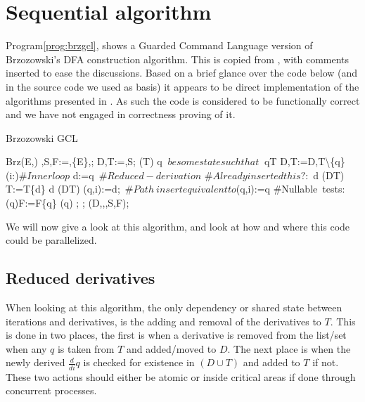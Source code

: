 \documentclass[a4paper,11pt]{report}
\begin{document}
\section{Sequential algorithm}
\label{}

Program\autoref{prog:brzgcl}, shows a Guarded Command Language version of
Brzozowski's DFA construction algorithm. This is copied from
\cite{strauss2008concurrent}, with comments inserted to ease the
discussions. Based on a brief glance over the code below (and in the
source code we used as basis) it appears to be direct
implementation of the algorithms presented in
\cite{watson1995taxonomies}. As such the code is considered to be
functionally correct and we have not engaged in correctness proving
of it. \begin{Program}[thf]
\caption{Brzozowski GCL 
\cite{strauss2008concurrent}}\label{prog:brzgcl}
\begin{gcl}
\FUNC Brz(E,\Sigma)\ARROW
\delta,S,F:=\emptyset,\{E\},\emptyset;
D,T:=\emptyset,S;
\DO (T\neq \emptyset) \ARROW
\LET q $\ be some state such that\ $ q\in T
D,T:=D,T\backslash \{q\}
\FOR (i:\Sigma)\ARROW $\#Inner loop$
d:=q\ $\#Reduced-derivation$
$\#Already inserted this $$?:$
\IF d \notin (D\cup T) \ARROW T:=T\cup\{d\}
\BAR d \in (D\cup T) \ARROW \SKIP
\FI
\delta(q,i):=d;\ $\#Path\ insert equivalent to $\delta(q,i):=q
\ROF
\#Nullable\ tests:
\IF \epsilon\in {}(q)\ARROW F:=F\cup\{q\}
\BAR \epsilon\notin {}(q)\ARROW \SKIP
\FI;
\OD;
\RETURN(D,\Sigma,\delta,S,F);
\end{gcl}
\end{Program}

We will now give a look at this algorithm, and look at how and where
this code could be parallelized.

\subsection{Reduced derivatives}
\label{sec:brzredder}
When looking at this algorithm, the only dependency or shared state
between iterations and derivatives, is the adding and removal of the
derivatives to $T$. This is done in two places, the first is when a
derivative is removed from the list/set when any $q$ is taken from $T$
and added/moved to $D$. The next place is when the newly derived
$\frac{d}{di}q$ is checked for existence in $(D\cup T)$ and added to
$T$ if not. These two actions should either be atomic or inside
critical areas if done through concurrent processes.
\end{document}

